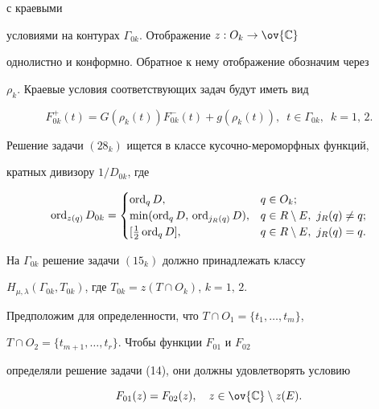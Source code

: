 с краевыми


условиями на контурах $\Gamma_{0k}$. Отображение $z: O_k\to\ov{\Bbb C}$


однолистно и конформно. Обратное к нему отображение обозначим через


$\rho_k$. Краевые условия соответствующих задач будут иметь вид


\begin{equation}


F_{0k}^+(t)=G(\rho_k(t))F^-_{0k}(t)+g(\rho_k(t)),\ \; t\in\Gamma_{0k},


\ \; k=1,\,2. \tag{28$_k$}


\end{equation}


\addtocounter{equation}{1}





Решение задачи $(28_k)$ ищется в классе кусочно-мероморфных функций,


кратных дивизору $1/D_{0k}$, где


$$


\ord_{z(q)}D_{0k}=\begin{cases}


\ord_qD, & q\in O_k;\\


\min(\ord_qD,\, \ord_{j_R(q)}D), & q\in R\setminus E,\ j_R(q)\ne q;\\


\lbrack\frac12\ord_qD], & q\in R\setminus E,\ j_R(q)=q.


\end{cases}


$$


На $\Gamma_{0k}$ решение задачи $(15_k)$ должно принадлежать классу


$H_{\mu,\lambda}(\Gamma_{0k},T_{0k})$, где $T_{0k}=z(T\cap O_k)$, $k=1,\,2$.


Предположим для определенности, что $T\cap O_1=\{t_1,\dotsc,t_m\}$,


$T\cap O_2=\{t_{m+1},\dotsc,t_r\}$. Чтобы функции $F_{01}$ и $F_{02}$


определяли решение задачи (14), они должны удовлетворять условию


\begin{equation}


F_{01}(z)=F_{02}(z),\quad z\in \ov{\Bbb C}\setminus z(E).


\end{equation}





